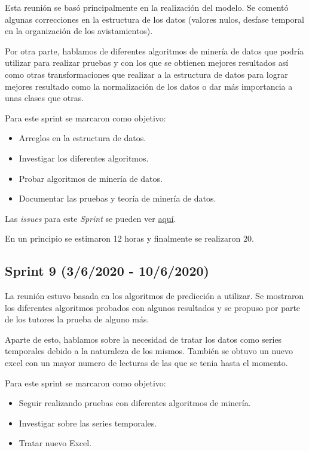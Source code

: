 Esta reunión se basó principalmente en la realización del modelo. Se comentó algunas correcciones en la estructura de los datos (valores nulos, desfase temporal en la organización de los avistamientos).

Por otra parte, hablamos de diferentes algoritmos de minería de datos que podría utilizar para realizar pruebas y con los que se obtienen mejores resultados así como otras transformaciones que realizar a la estructura de datos para lograr mejores resultado como la normalización de los datos o dar más importancia a unas clases que otras.

Para este sprint se marcaron como objetivo:
\begin{itemize}
	\item Arreglos en la estructura de datos.
	\item Investigar los diferentes algoritmos.
	\item Probar algoritmos de minería de datos.
	\item Documentar las pruebas y teoría de minería de datos.
\end{itemize} 

Las \emph{issues} para este \emph{Sprint} se pueden ver \href{https://github.com/psnti/TFG-Pablo-Santidrian-Tudanca/milestone/8}{aquí}.


En un principio se estimaron 12 horas y finalmente se realizaron 20.

\subsection{Sprint 9 (3/6/2020 - 10/6/2020)}\label{Sprint-9}
La reunión estuvo basada en los algoritmos de predicción a utilizar. Se mostraron los diferentes algoritmos probados con algunos resultados y se propuso por parte de los tutores la prueba de alguno más.

Aparte de esto, hablamos sobre la necesidad de tratar los datos como series temporales debido a la naturaleza de los mismos. También se obtuvo un nuevo excel con un mayor numero de lecturas de las que se tenia hasta el momento.


Para este sprint se marcaron como objetivo:
\begin{itemize}
	\item Seguir realizando pruebas con diferentes algoritmos de minería.
	\item Investigar sobre las series temporales.
	\item Tratar nuevo Excel.
\end{itemize} 

